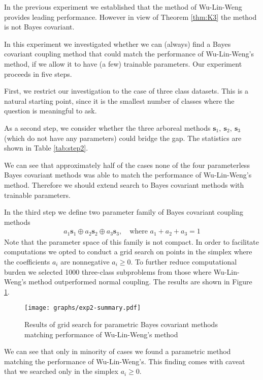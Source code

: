 \documentclass[twoside,11pt]{article}
\begin{document}
In the previous experiment we established that the method of Wu-Lin-Weng provides leading performance. However in view of Theorem \ref{thm:K3} the method is not Bayes covariant. 

In this experiment we investigated whether we can (always) find  a Bayes covariant coupling method that could match the performance of Wu-Lin-Weng's method, if we allow it to have (a few) trainable parameters.  Our experiment proceeds in five steps. 

First, we restrict our investigation to the case of three class datasets. This is a natural starting point, since it is the smallest number of classes where the question is meaningful to ask. 

As a second step, we consider whether the three arboreal methods $ \boldsymbol{s}_1,~ \boldsymbol{s}_2,~ \boldsymbol{s}_3$ (which do not have any parameters) could bridge the gap. The statistics are shown in Table \ref{tab:step2}. 




We can see that approximately half of the cases none of the four parameterless Bayes covariant methods was able to match the performance of Wu-Lin-Weng's method. Therefore we should extend search to Bayes covariant methods with trainable parameters.


In the third step we define two parameter family of Bayes covariant coupling methods
\begin{align}
a_1 \boldsymbol{s}_1 \oplus a_2 \boldsymbol{s}_2 \oplus a_3 \boldsymbol{s}_3,\quad\textrm{where } a_1 + a_2 +a_3 = 1 \label{eq:family}
\end{align}
Note that the parameter space of this family is not compact. In order to facilitate computations we opted to conduct a grid search on points in the simplex where the coefficients $a_i$ are nonnegative $a_i \geq 0$.  To further reduce computational burden we selected 1000 three-class subproblems from those where Wu-Lin-Weng's method outperformed normal coupling. The results are shown in Figure \ref{fig:par-bc}.

\begin{figure}[!ht]
\texttt{[image: graphs/exp2-summary.pdf]}
\caption{Results of grid search for parametric Bayes covariant methods matching performance of Wu-Lin-Weng's method}
\label{fig:par-bc}
\end{figure}

We can see that only in minority of cases we found a parametric method matching the performance of Wu-Lin-Weng's. This finding comes with caveat that we searched only in the simplex $a_i \geq 0$. 
\end{document}
